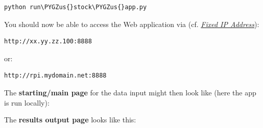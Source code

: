 \documentclass[letterpaper,10pt,english]{sphinxmanual}
\def\PYGZus{\char`\_}
\begin{document}
\begin{Verbatim}[commandchars=\\\{\}]
python run\PYGZus{}stock\PYGZus{}app.py
\end{Verbatim}

You should now be able to access the Web application via (cf. {\hyperref[00_basic_config:fixip]{\emph{Fixed IP Address}}}):

\begin{Verbatim}[commandchars=\\\{\}]
http://xx.yy.zz.100:8888
\end{Verbatim}

or:

\begin{Verbatim}[commandchars=\\\{\}]
http://rpi.mydomain.net:8888
\end{Verbatim}

The \textbf{starting/main page} for the data input might then look like (here the app is run locally):


The \textbf{results output page} looks like this:

\end{document}
